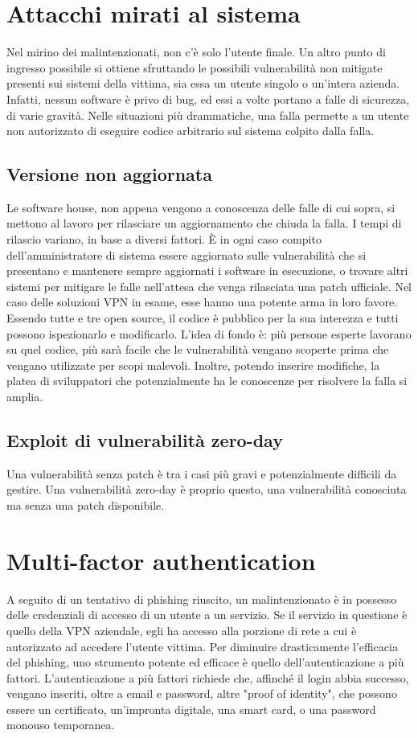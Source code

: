 \section{Attacchi mirati al sistema}
Nel mirino dei malintenzionati, non c'è solo l'utente finale. Un altro punto di ingresso possibile si ottiene sfruttando le possibili vulnerabilità non mitigate presenti sui sistemi della vittima, sia essa un utente singolo o un'intera azienda.
Infatti, nessun software è privo di bug, ed essi a volte portano a falle di sicurezza, di varie gravità. Nelle situazioni più drammatiche, una falla permette a un utente non autorizzato di eseguire codice arbitrario sul sistema colpito dalla falla.

\subsection{Versione non aggiornata}
Le software house, non appena vengono a conoscenza delle falle di cui sopra, si mettono al lavoro per rilasciare un aggiornamento che chiuda la falla.
I tempi di rilascio variano, in base a diversi fattori. È in ogni caso compito dell'amministratore di sistema essere aggiornato sulle vulnerabilità che si presentano e mantenere sempre aggiornati i software in esecuzione, o trovare altri sistemi per mitigare le falle nell'attesa che venga rilasciata una patch ufficiale.
Nel caso delle soluzioni VPN in esame, esse hanno una potente arma in loro favore.
Essendo tutte e tre open source, il codice è pubblico per la sua interezza e tutti possono ispezionarlo e modificarlo.
L'idea di fondo è: più persone esperte lavorano su quel codice, più sarà facile che le vulnerabilità vengano scoperte prima che vengano utilizzate per scopi malevoli.
Inoltre, potendo inserire modifiche, la platea di sviluppatori che potenzialmente ha le conoscenze per risolvere la falla si amplia.

\subsection{Exploit di vulnerabilità zero-day}
Una vulnerabilità senza patch è tra i casi più gravi e potenzialmente difficili da gestire. Una vulnerabilità zero-day è proprio questo, una vulnerabilità conosciuta ma senza una patch disponibile.

\section{Multi-factor authentication}
A seguito di un tentativo di phishing riuscito, un malintenzionato è in possesso delle credenziali di accesso di un utente a un servizio. Se il servizio in questione è quello della VPN aziendale, egli ha accesso alla porzione di rete a cui è autorizzato ad accedere l'utente vittima.
Per diminuire drasticamente l'efficacia del phishing, uno strumento potente ed efficace è quello dell'autenticazione a più fattori.
L'autenticazione a più fattori richiede che, affinché il login abbia successo, vengano inseriti, oltre a email e password, altre "proof of identity", che possono essere un certificato, un'impronta digitale, una smart card, o una password monouso temporanea.

